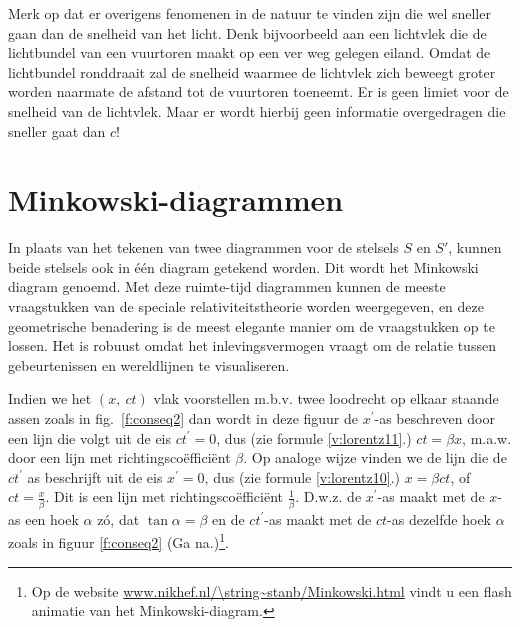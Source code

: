 Merk op dat er overigens fenomenen in de natuur te vinden zijn die
wel sneller gaan dan de snelheid van het licht. Denk bijvoorbeeld aan
een lichtvlek die de lichtbundel van een vuurtoren maakt op een ver
weg gelegen eiland. Omdat de lichtbundel ronddraait zal de snelheid
waarmee de lichtvlek zich beweegt groter worden naarmate de afstand
tot de vuurtoren toeneemt. Er is geen limiet voor de snelheid van de
lichtvlek. Maar er wordt hierbij geen informatie overgedragen die
sneller gaat dan $c$!


\section{Minkowski-diagrammen}
In plaats van het tekenen van twee diagrammen voor de stelsels $S$ en
$S'$, kunnen beide stelsels ook in \'e\'en diagram getekend
worden. Dit wordt het Minkowski diagram genoemd.  Met deze ruimte-tijd
diagrammen kunnen de meeste vraagstukken van de speciale
relativiteitstheorie worden weergegeven, en deze geometrische
benadering is de meest elegante manier om de vraagstukken op te
lossen. Het is robuust omdat het inlevingsvermogen vraagt om de relatie
tussen gebeurtenissen en wereldlijnen te visualiseren.

 
Indien we het $(x,\ ct)$ vlak voorstellen m.b.v. twee loodrecht op
elkaar staande assen zoals in fig.~\ref{f:conseq2} dan wordt in deze
figuur de $x^{'}$-as beschreven door een lijn die volgt uit de eis
$ct^{'} = 0$, dus (zie formule \ref{v:lorentz11}.) $ct = \beta x$,
m.a.w. door een lijn met richtingsco\"{e}ffici\"{e}nt $\beta$.  Op
analoge wijze vinden we de lijn die de $ct^{'}$ as beschrijft uit de
eis $x^{'} = 0$, dus (zie formule \ref{v:lorentz10}.)  $x = \beta ct$,
of $ct = \frac{x}{\beta}$.  Dit is een lijn met
richtingsco\"{e}ffici\"{e}nt $\frac{1}{\beta}$.  D.w.z. de $x^{'}$-as
maakt met de $x$-as een hoek $\alpha$ z\'{o}, dat  $\tan \alpha = \beta$
en de $ct^{'}$-as maakt met de $ct$-as dezelfde hoek $\alpha$ zoals in
figuur \ref{f:conseq2} (Ga na.)\footnote{Op de website \url{www.nikhef.nl/\string~stanb/Minkowski.html} vindt u een flash animatie van het Minkowski-diagram.}.


